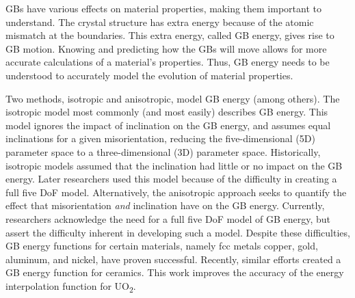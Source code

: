 \documentclass[12pt]{report}
\begin{document}
GBs have various effects on material properties, making them important to understand.\cite{patala2013, homer2015, bulatov2014}  The crystal structure has extra energy because of the atomic mismatch at the boundaries.  This extra energy, called GB energy, gives rise to GB motion.  Knowing and predicting how the GBs will move allows for more accurate calculations of a material's properties.  Thus, GB energy needs to be understood to accurately model the evolution of material properties.

Two methods, isotropic and anisotropic, model GB energy (among others).  The isotropic model most commonly (and most easily) describes GB energy.  This model ignores the impact of inclination on the GB energy, and assumes equal inclinations for a given misorientation, reducing the five-dimensional (5D) parameter space to a three-dimensional (3D) parameter space.  Historically, isotropic models assumed that the inclination had little or no impact on the GB energy.  Later researchers used this model because of the difficulty in creating a full five DoF model.\cite{homer2015}  Alternatively, the anisotropic approach seeks to quantify the effect that misorientation \emph{and} inclination have on the GB energy.  Currently, researchers acknowledge the need for a full five DoF model of GB energy, but assert the difficulty inherent in developing such a model.\cite{rohrer2011, lejcek2010, homer2015}  Despite these difficulties, GB energy functions for certain materials, namely fcc metals copper, gold, aluminum, and nickel, have proven successful.\cite{bulatov2014} Recently,\cite{harbison2015} similar efforts created a GB energy function for ceramics.  This work improves the accuracy of the energy interpolation function for UO\textsubscript{2}.

\end{document}
